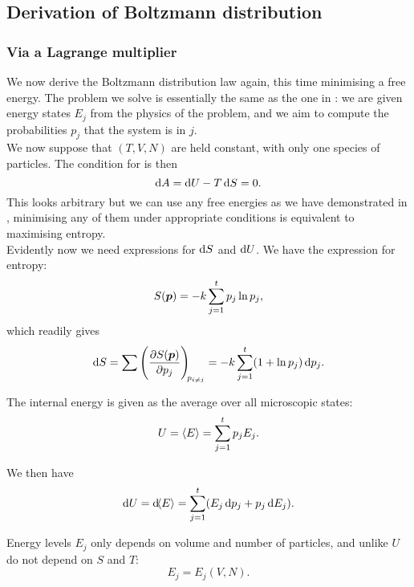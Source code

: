\subsection{Derivation of Boltzmann distribution}
\subsubsection{Via a Lagrange multiplier}
We now derive the Boltzmann distribution law again, this time minimising a free energy. 
The problem we solve is essentially the same as the one in : 
we are given energy states $E_j$ from the physics of the problem, 
and we aim to compute the probabilities $p_j$ that the system is in $j$. \\
We now suppose that $(T,V,N)$ are held constant, with only one species of particles. 
The condition for \eqm is then 
\begin{equation}
\dif A=\dif U-T\dif S=0.
\end{equation}
This looks arbitrary but we can use any free energies as we have demonstrated in 
, minimising any of them under appropriate conditions 
is equivalent to maximising entropy. \\
Evidently now we need expressions for $\dif S$ and $\dif U$. 
We have the expression for entropy:
\begin{equation}
S(\boldsymbol{p})=-k\sum^{t}_{j=1}p_j\ln p_j, 
\end{equation}
which readily gives
\begin{equation}
\dif S=\sum\diffp{S(\bvec{p})}{p_j}[p_{i\neq j}]=-k\sum^t_{j=1}(1+\ln p_j)\dif p_j.
\end{equation}
\begin{post}
The internal energy is given as the average over all microscopic states:
\begin{equation}
U=\langle E\rangle=\sum^{t}_{j=1}p_jE_j.
\end{equation}
\end{post}
We then have
\begin{equation}
\label{du_boltz}
\dif U=\dif \lgl E\rgl=\sum^{t}_{j=1} (E_j\dif p_j+p_j\dif E_j).
\end{equation}
\begin{post}
Energy levels $E_j$ only depends on volume and number of particles, and unlike $U$ do not depend on $S$ and $T$:
\begin{equation}
E_j=E_j(V,N).
\end{equation}
\end{post}
